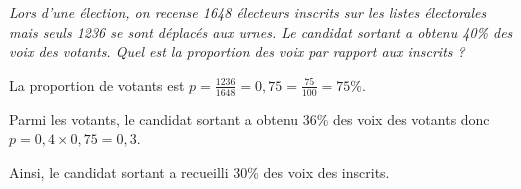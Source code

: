 \begin{Ex}
\textit{Lors d'une élection, on recense 1648 électeurs inscrits sur les listes électorales mais seuls 1236 se sont déplacés aux urnes. Le candidat  sortant   a obtenu 40\% des voix des votants. Quel est la proportion des voix par rapport aux inscrits ?  }

La proportion de votants est $p=\frac{1236}{1648}=0,75=\frac{75}{100}=75\%$.

Parmi les votants, le candidat sortant a obtenu 36\% des voix des votants donc $p = 0,4 \times 0,75 = 0,3$.

Ainsi, le candidat sortant a recueilli 30\% des voix des inscrits.
\end{Ex}






 
